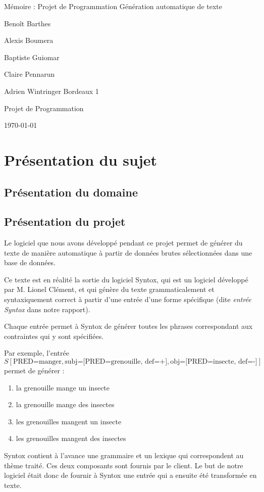 \documentclass[12pt]{report}
\begin{document}
\begin{titlepage}
\begin{center}

\hfill

\bigskip
\huge{Mémoire  : Projet de Programmation} 
\vfill
\bigskip 
\Huge 
\bigskip Génération automatique de texte \par 
\vfill
\Large Benoît Barthes \par 
		Alexis Boumera \par 
		Baptiste Guiomar \par 
		Claire Pennarun \par 
		Adrien Wintringer
\vfill
\Large Bordeaux 1 \par \Large Projet de Programmation		
		\bigskip 
\bigskip

\Large
\today
\end{center}
\end{titlepage}

\tableofcontents
\newpage

\chapter{Présentation du sujet}

\section{Présentation du domaine}

\section{Présentation du projet}

Le logiciel que nous avons développé pendant ce projet permet de générer du texte de manière automatique à partir de données brutes sélectionnées dans une base de données. 

\bigskip

Ce texte est en réalité la sortie du logiciel Syntox, qui est un logiciel développé par M. Lionel Clément, et qui génère du texte grammaticalement et syntaxiquement correct à partir d'une entrée d'une forme spécifique (dite \emph{entrée Syntox} dans notre rapport).

Chaque entrée permet à Syntox de générer toutes les phrases correspondant aux contraintes qui y sont spécifiées.

Par exemple, l'entrée 
$$S [\text{PRED=manger},
    \text{subj=[PRED=grenouille, def=+]},
    \text{obj=[PRED=insecte, def=-]}
]$$
permet de générer :
\begin{enumerate}
    \item la grenouille mange un insecte
    \item la grenouille mange des insectes
    \item les grenouilles mangent un insecte
    \item les grenouilles mangent des insectes
\end{enumerate}
Syntox contient à l'avance une grammaire et un lexique qui correspondent au thème traité. Ces deux composants sont fournis par le client.
Le but de notre logiciel était donc de fournir à Syntox une entrée qui a ensuite été transformée en texte.
\end{document}
